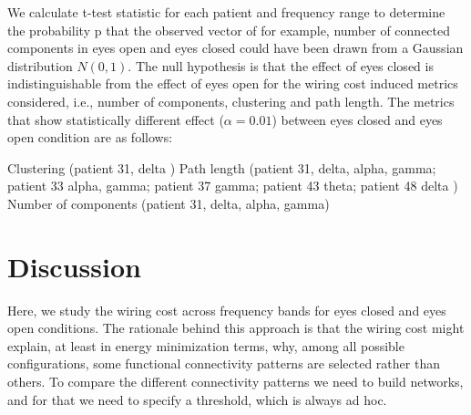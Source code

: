 \documentclass[11pt, onecolumn]{article}
\begin{document}
We calculate t-test statistic for each patient and frequency range to determine the probability p that the observed vector of for example, number of connected components in eyes open and eyes closed could have been drawn from a Gaussian distribution $N(0,1)$.
The null hypothesis is that the effect of eyes closed is indistinguishable from the effect of eyes open for the wiring cost induced metrics considered, i.e., number of components, clustering and path length. 
The metrics that show statistically different effect ($\alpha = 0.01$) between eyes closed and eyes open condition are as follows:

Clustering (patient 31, delta )
Path length (patient 31, delta, alpha, gamma; patient 33 alpha, gamma; patient 37 gamma; patient 43 theta; patient 48 delta )
Number of components (patient 31, delta, alpha, gamma)





\section{Discussion}

Here, we study the wiring cost across frequency bands for eyes closed and eyes open conditions. The rationale behind this approach is that the wiring cost might explain, at least in energy minimization terms, why, among all possible configurations, some functional connectivity patterns are selected rather than others. 
To compare the different connectivity patterns we need to build networks, and for that we need to specify a threshold, which is always ad hoc.
\end{document}
